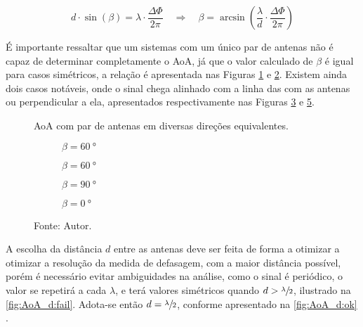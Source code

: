 \begin{equation}\label{eq:defasagem}
    d \cdot \sin\left(\beta\right) = \lambda \cdot \frac{\Delta\Phi}{2 \pi} \quad \Rightarrow \quad \beta = \arcsin \left(\frac{\lambda}{d} \cdot \frac{\Delta\Phi}{2 \pi}\right)
\end{equation}

É importante ressaltar que um sistemas com um único par de antenas não é capaz de determinar completamente o \ac{AoA}, já que o valor calculado de $\beta$ é igual para casos simétricos, a relação é apresentada nas Figuras \ref{fig:AoA:1} e \ref{fig:AoA:2}.
Existem ainda dois casos notáveis, onde o sinal chega alinhado com a linha das com as antenas ou perpendicular a ela, apresentados respectivamente nas Figuras \ref{fig:AoA:3} e \ref{fig:AoA:4}.

\begin{figure}
    \caption{\ac{AoA} com par de antenas em diversas direções equivalentes.}
    \label{fig:AoA}

    \hfill
    \begin{subfigure}[b]{0.45\textwidth}
        \centering
        \caption{$\beta=\SI{60}{\degree}$}
        
        \label{fig:AoA:1}
    \end{subfigure}
    \hfill
    \begin{subfigure}[b]{0.45\textwidth}
        \centering
        \caption{$\beta=\SI{60}{\degree}$}
        
        \label{fig:AoA:2}
    \end{subfigure}
    \hfill

    \hfill
    \begin{subfigure}[b]{0.45\textwidth}
        \centering
        \caption{$\beta=\SI{90}{\degree}$}
        
        \label{fig:AoA:3}
    \end{subfigure}
    \hfill
    \begin{subfigure}[b]{0.45\textwidth}
        \centering
        \caption{$\beta=\SI{0}{\degree}$}
        
        \label{fig:AoA:4}
    \end{subfigure}
    \hfill

    \caption*{Fonte: Autor.}
\end{figure}

A escolha da distância $d$ entre as antenas deve ser feita de forma a otimizar a otimizar a resolução da medida de defasagem, com a maior distância possível, porém é necessário evitar ambiguidades na análise, como o sinal é periódico, o valor se repetirá a cada $\lambda$, e terá valores simétricos quando $d > \sfrac{\lambda}{2}$, ilustrado na \autoref{fig:AoA_d:fail}.
Adota-se então $d=\sfrac{\lambda}{2}$, conforme apresentado na \autoref{fig:AoA_d:ok} \cite{bensky2016wireless, horst2021localization}.

